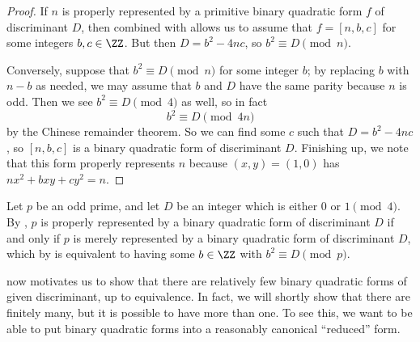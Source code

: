 \documentclass[../notes.tex]{subfiles}
\begin{document}
\begin{proof}
	If $n$ is properly represented by a primitive binary quadratic form $f$ of discriminant $D$, then  combined with  allows us to assume that $f=[n,b,c]$ for some integers $b,c\in\ZZ$. But then $D=b^2-4nc$, so $b^2\equiv D\pmod n$.

	Conversely, suppose that $b^2\equiv D\pmod n$ for some integer $b$; by replacing $b$ with $n-b$ as needed, we may assume that $b$ and $D$ have the same parity because $n$ is odd. Then we see $b^2\equiv D\pmod4$ as well, so in fact
	\[b^2\equiv D\pmod{4n}\]
	by the Chinese remainder theorem. So we can find some $c$ such that $D=b^2-4nc$, so $[n,b,c]$ is a binary quadratic form of discriminant $D$. Finishing up, we note that this form properly represents $n$ because $(x,y)=(1,0)$ has $nx^2+bxy+cy^2=n$.
\end{proof}
\begin{example}
	Let $p$ be an odd prime, and let $D$ be an integer which is either $0$ or $1\pmod4$. By , $p$ is properly represented by a binary quadratic form of discriminant $D$ if and only if $p$ is merely represented by a binary quadratic form of discriminant $D$, which by  is equivalent to having some $b\in\ZZ$ with $b^2\equiv D\pmod p$.
\end{example}
 now motivates us to show that there are relatively few binary quadratic forms of given discriminant, up to equivalence. In fact, we will shortly show that there are finitely many, but it is possible to have more than one. To see this, we want to be able to put binary quadratic forms into a reasonably canonical ``reduced'' form.
\end{document}
